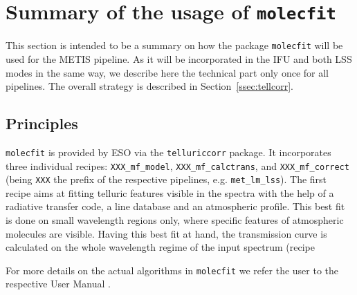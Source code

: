 \section{Summary of the usage of \texttt{molecfit}}\label{app:mf}
This section is intended to be a summary on how the package \texttt{molecfit} will be used for the \ac{METIS} pipeline. As it will be incorporated in the \ac{IFU} and both \ac{LSS} modes in the same way, we describe here the technical part only once for all pipelines. The overall strategy is described in Section~\ref{ssec:tellcorr}.
\subsection{Principles}\label{app:mf_principles}
\texttt{molecfit} is provided by \ac{ESO} via the \texttt{telluriccorr} package. It incorporates three individual recipes: \texttt{XXX_mf_model}, \texttt{XXX_mf_calctrans}, and \texttt{XXX_mf_correct} (being \texttt{XXX} the prefix of the respective pipelines, e.g. \texttt{met_lm_lss}). The first recipe aims at fitting telluric features visible in the spectra with the help of a radiative transfer code, a line database and an atmospheric profile. This best fit is done on small wavelength regions only, where specific features of atmospheric molecules are visible. Having this best fit at hand, the transmission curve is calculated on the whole wavelength regime of the input spectrum (recipe 

For more details on the actual algorithms in \texttt{molecfit} we refer the user to the respective User Manual \cite{molecfit}.\\


